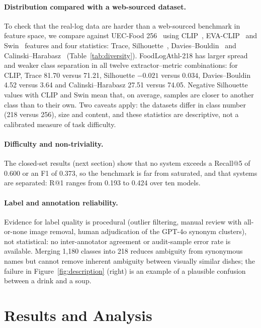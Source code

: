 \documentclass[sigconf, nonacm]{acmart}
\begin{document}
\paragraph{Distribution compared with a web-sourced dataset.} To check that the real-log data are harder than a web-sourced benchmark in feature space, we compare against UEC-Food 256~\cite{kawano2015automatic} using CLIP~\cite{CLIP}, EVA-CLIP~\cite{sun2023eva} and Swin~\cite{liu2021swin} features and four statistics: Trace, Silhouette~\cite{rousseeuw1987silhouettes}, Davies--Bouldin~\cite{davies1979cluster} and Calinski--Harabasz~\cite{calinski1974dendrite} (Table~\ref{tab:diversity}). FoodLogAthl-218 has larger spread and weaker class separation in all twelve extractor--metric combinations: for CLIP, Trace 81.70 versus 71.21, Silhouette $-0.021$ versus $0.034$, Davies--Bouldin 4.52 versus 3.64 and Calinski--Harabasz 27.51 versus 74.05. Negative Silhouette values with CLIP and Swin mean that, on average, samples are closer to another class than to their own. Two caveats apply: the datasets differ in class number (218 versus 256), size and content, and these statistics are descriptive, not a calibrated measure of task difficulty.

\paragraph{Difficulty and non-triviality.} The closed-set results (next section) show that no system exceeds a Recall@5 of 0.600 or an F1 of 0.373, so the benchmark is far from saturated, and that systems are separated: R@1 ranges from 0.193 to 0.424 over ten models.

\paragraph{Label and annotation reliability.} Evidence for label quality is procedural (outlier filtering, manual review with all-or-none image removal, human adjudication of the GPT-4o synonym clusters), not statistical: no inter-annotator agreement or audit-sample error rate is available. Merging 1,180 classes into 218 reduces ambiguity from synonymous names but cannot remove inherent ambiguity between visually similar dishes; the failure in Figure~\ref{fig:description} (right) is an example of a plausible confusion between a drink and a soup.

\section{Results and Analysis}
\label{sec:results}
\end{document}

